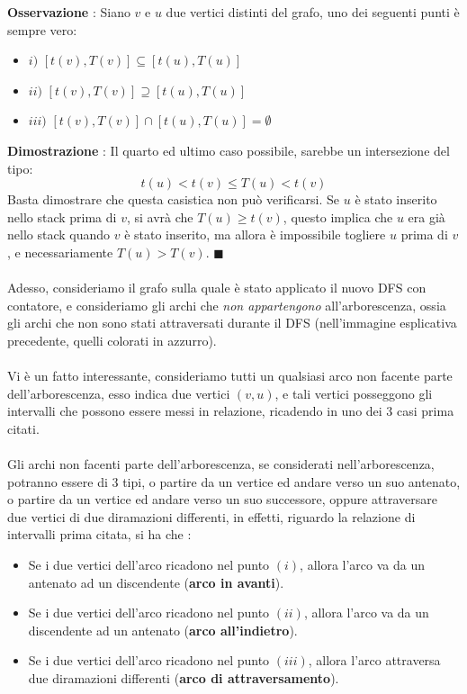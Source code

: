 \documentclass[12pt, letterpaper]{article}
\newcommand{\acc}{\\\hphantom{}\\}
\begin{document}
\textbf{Osservazione} : Siano \(v\) e \(u\) due vertici distinti del grafo, uno dei seguenti punti è sempre vero:\begin{itemize}
    \item \(i)\) $[t(v),T(v)]\subseteq[t(u),T(u)]$
    \item \(ii)\) $[t(v),T(v)]\supseteq[t(u),T(u)]$
    \item \(iii)\) $[t(v),T(v)]\cap[t(u),T(u)]=\emptyset$
\end{itemize}
\textbf{Dimostrazione} : Il quarto ed ultimo caso possibile, sarebbe un intersezione del tipo: $$
t(u)<t(v)\le T(u)<t(v)$$ Basta dimostrare che questa casistica non può verificarsi. Se \(u\) è stato inserito 
nello stack prima di \(v\), si avrà che \(T(u)\ge t(v)\), questo implica che \(u\) era già nello stack quando 
\(v\) è stato inserito, ma allora è impossibile togliere \(u\) prima di \(v\), e necessariamente \(T(u)>T(v)\). \(\blacksquare\)\acc 
Adesso, consideriamo il grafo sulla quale è stato applicato il nuovo DFS con contatore, e consideriamo gli archi che \textit{non appartengono} 
all'arborescenza, ossia gli archi che non sono stati attraversati durante il DFS (nell'immagine esplicativa precedente, quelli colorati in 
azzurro). \acc 
Vi è un fatto interessante, consideriamo tutti un qualsiasi arco non facente parte dell'arborescenza, esso indica due vertici \((v,u)\), 
e tali vertici posseggono gli intervalli che possono essere messi in relazione, ricadendo in uno dei 3 casi prima citati.\acc Gli archi 
non facenti parte dell'arborescenza, se considerati nell'arborescenza, potranno essere di 3 tipi, o partire da un vertice ed andare 
verso un suo antenato, o partire da un vertice ed andare 
verso un suo successore, oppure attraversare due vertici di due diramazioni differenti, in effetti, riguardo la relazione 
di intervalli prima citata, si ha che : \begin{itemize}
    \item Se i due vertici dell'arco ricadono nel punto \((i)\), allora l'arco va da un antenato ad un discendente (\textbf{arco in avanti}).
    \item Se i due vertici dell'arco ricadono nel punto \((ii)\), allora l'arco va da un discendente ad un antenato  (\textbf{arco all'indietro}).
    \item Se i due vertici dell'arco ricadono nel punto \((iii)\), allora l'arco attraversa due diramazioni differenti  (\textbf{arco di attraversamento}).
\end{itemize}
\end{document}
